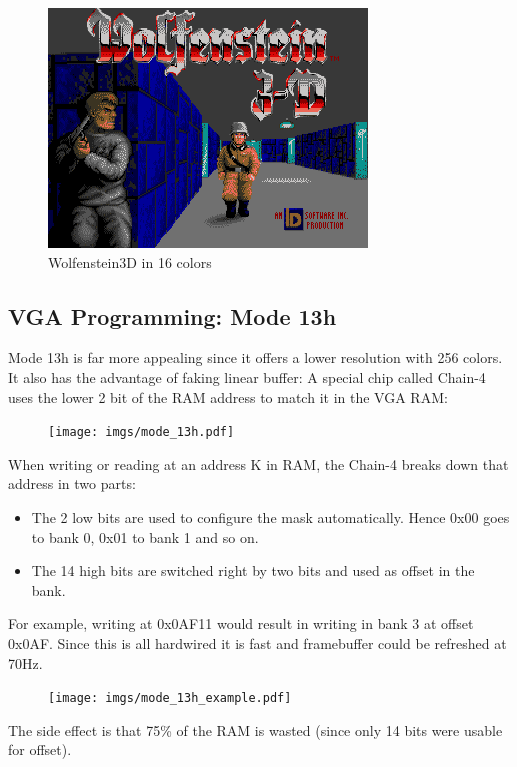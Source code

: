 \documentclass[book.tex]{subfiles}
\begin{document}
 \begin{figure}[H]
\centering
 \includegraphics[width=\textwidth]{imgs/wolf3d_ega.png}
 \caption{Wolfenstein3D in 16 colors}
\end{figure}





 
  \subsection{VGA Programming: Mode 13h}
  Mode 13h is far more appealing since it offers a lower resolution with 256 colors. It also has the advantage of faking linear buffer: A special chip called Chain-4 uses the lower 2 bit of the RAM address to match it in the VGA RAM:\\
  \par
 \begin{figure}[H]
\centering
      \texttt{[image: imgs/mode\_13h.pdf]}
\end{figure}
\par

When writing or reading at an address K in RAM, the Chain-4 breaks down that address in two parts:
\begin{itemize}
\item The 2 low bits are used to configure the mask automatically. Hence 0x00 goes to bank 0, 0x01 to bank 1 and so on.
\item The 14 high bits are switched right by two bits and used as offset in the bank.
\end{itemize}
  \par
  For example, writing at 0x0AF11 would result in writing in bank 3 at offset 0x0AF. Since this is all hardwired it is fast and framebuffer could be refreshed at 70Hz.
 \begin{figure}[H]
\centering
      \texttt{[image: imgs/mode\_13h\_example.pdf]}
\end{figure}
\par
The side effect is that 75\% of the RAM is wasted (since only 14 bits were usable for offset).\\
\end{document}
